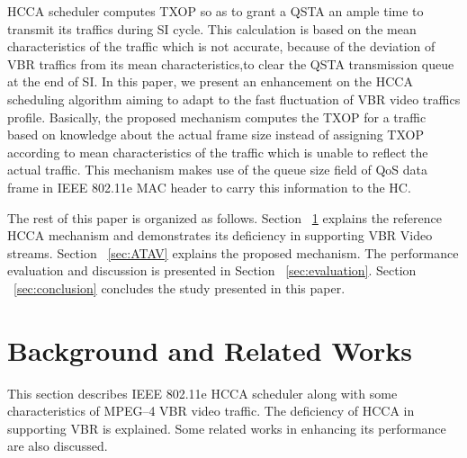 \documentclass[a4paper, conference]{IEEEtran}
\begin{document}
HCCA scheduler computes TXOP so as to grant a QSTA an ample time to transmit its traffics during SI cycle. This calculation is based on the mean characteristics of the traffic which is not accurate, because of the deviation of VBR traffics from its mean characteristics,to clear the QSTA transmission queue at the end of SI. In this paper, we present an enhancement on the HCCA scheduling algorithm aiming to adapt to the fast fluctuation of VBR video traffics profile. Basically, the proposed mechanism computes the TXOP for a traffic based on knowledge about the actual frame size instead of assigning TXOP according to mean characteristics of the traffic which is unable to reflect the actual traffic. This mechanism makes use of the queue size field of QoS data frame in IEEE 802.11e MAC header to carry this information to the HC.

The rest of this paper is organized as follows. Section ~\ref{sec:relatedWorks} explains the reference HCCA mechanism and demonstrates its deficiency in supporting VBR Video streams. Section ~\ref{sec:ATAV} explains the proposed mechanism. The performance evaluation and discussion is presented in Section ~\ref{sec:evaluation}. Section ~\ref{sec:conclusion} concludes the study presented in this paper.


\section{Background and Related Works}
\label{sec:relatedWorks}
This section describes IEEE 802.11e HCCA scheduler along with some characteristics of  MPEG--4 VBR video traffic. The deficiency of HCCA in supporting VBR is explained. Some related works in enhancing its performance are also discussed.
\end{document}
